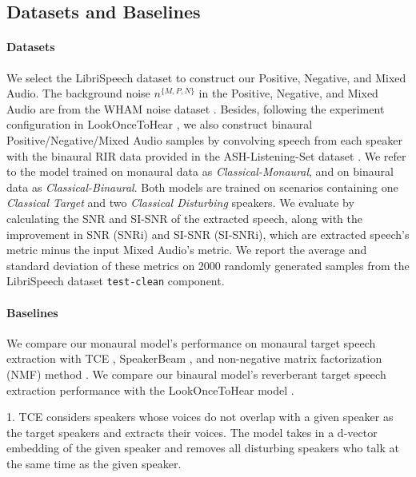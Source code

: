 \begin{table*}[!t]
\begin{center}
{\begin{tabular}{lccccccc}
\bottomrule
\end{tabular}}
\end{center}
\vskip -0.2in
\end{table*}

\subsection{Datasets and Baselines}

\paragraph{Datasets}  We select the LibriSpeech dataset \cite{librispeech} to construct our Positive, Negative, and Mixed Audio. The background noise $n^{\{M, P, N\}}$ in the Positive, Negative, and Mixed Audio are from the WHAM noise dataset \cite{wham}. 
Besides, following the experiment configuration in LookOnceToHear \cite{Veluri2024lookonce}, we also construct binaural Positive/Negative/Mixed Audio samples by convolving speech from each speaker with the binaural RIR data provided in the ASH-Listening-Set dataset \cite{ASH-brir}. We refer to the model trained on monaural data as \textit{Classical-Monaural}, and on binaural data as \textit{Classical-Binaural}. Both models are trained on scenarios containing one \textit{Classical Target} and two \textit{Classical Disturbing} speakers. We evaluate by calculating the SNR and SI-SNR of the extracted speech, along with the improvement in SNR (SNRi) and SI-SNR (SI-SNRi), which are extracted speech's metric minus the input Mixed Audio's metric. We report the average and standard deviation of these metrics on 2000 randomly generated samples from the LibriSpeech dataset \texttt{test-clean} component.

\paragraph{Baselines} We compare our monaural model's performance on monaural target speech extraction with TCE \cite{Chen2024tce}, SpeakerBeam \cite{speakerbeam}, and non-negative matrix factorization (NMF) method \cite{NMF}. We compare our binaural model's reverberant target speech extraction performance with the LookOnceToHear model \cite{Veluri2024lookonce}. 

1. TCE \cite{Chen2024tce} considers speakers whose voices do not overlap with a given speaker as the target speakers and extracts their voices. The model takes in a d-vector embedding of the given speaker and removes all disturbing speakers who talk at the same time as the given speaker. 

